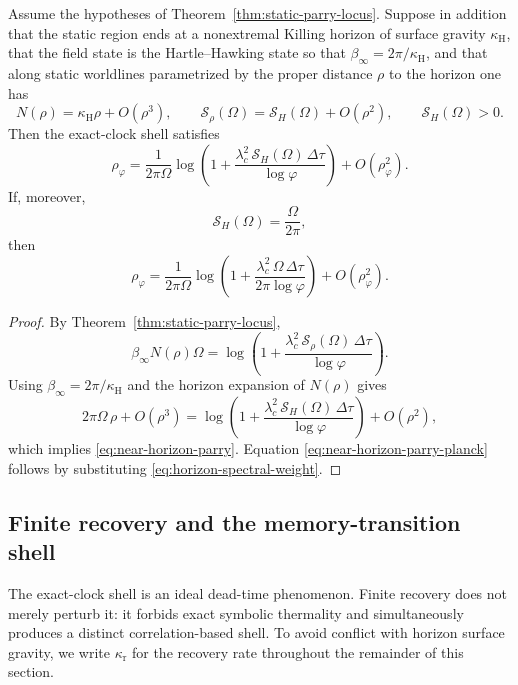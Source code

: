 \begin{corollary}\label{cor:near-horizon-parry}
Assume the hypotheses of Theorem~\ref{thm:static-parry-locus}. Suppose in addition that the static region ends at a nonextremal Killing horizon of surface gravity $\kappa_{\mathrm H}$, that the field state is the Hartle--Hawking state so that $\beta_\infty=2\pi/\kappa_{\mathrm H}$, and that along static worldlines parametrized by the proper distance $\rho$ to the horizon one has
\[
N(\rho)=\kappa_{\mathrm H}\rho+O(\rho^3),
\qquad
\mathcal S_\rho(\Omega)=\mathcal S_H(\Omega)+O(\rho^2),
\qquad
\mathcal S_H(\Omega)>0.
\]
Then the exact-clock shell satisfies
\begin{equation}\label{eq:near-horizon-parry}
\rho_\varphi
=
\frac{1}{2\pi\Omega}
\log\!\left(
1+\frac{\lambda_c^2\,\mathcal S_H(\Omega)\,\Delta\tau}{\log\varphi}
\right)
+O(\rho_\varphi^2).
\end{equation}
If, moreover,
\begin{equation}\label{eq:horizon-spectral-weight}
\mathcal S_H(\Omega)=\frac{\Omega}{2\pi},
\end{equation}
then
\begin{equation}\label{eq:near-horizon-parry-planck}
\rho_\varphi
=
\frac{1}{2\pi\Omega}
\log\!\left(
1+\frac{\lambda_c^2\,\Omega\,\Delta\tau}{2\pi\log\varphi}
\right)
+O(\rho_\varphi^2).
\end{equation}
\end{corollary}

\begin{proof}
By Theorem~\ref{thm:static-parry-locus},
\[
\beta_\infty N(\rho)\Omega
=
\log\!\left(
1+\frac{\lambda_c^2\,\mathcal S_\rho(\Omega)\,\Delta\tau}{\log\varphi}
\right).
\]
Using $\beta_\infty=2\pi/\kappa_{\mathrm H}$ and the horizon expansion of $N(\rho)$ gives
\[
2\pi\Omega\,\rho+O(\rho^3)
=
\log\!\left(
1+\frac{\lambda_c^2\,\mathcal S_H(\Omega)\,\Delta\tau}{\log\varphi}
\right)
+O(\rho^2),
\]
which implies \eqref{eq:near-horizon-parry}. Equation \eqref{eq:near-horizon-parry-planck} follows by substituting \eqref{eq:horizon-spectral-weight}.
\end{proof}

\subsection{Finite recovery and the memory-transition shell}

The exact-clock shell is an ideal dead-time phenomenon. Finite recovery does not merely perturb it: it forbids exact symbolic thermality and simultaneously produces a distinct correlation-based shell. To avoid conflict with horizon surface gravity, we write $\kappa_{\mathrm r}$ for the recovery rate throughout the remainder of this section.

